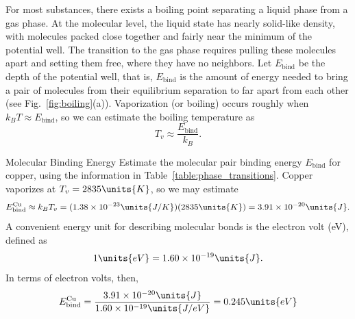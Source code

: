%

For most substances, there exists a boiling point separating a liquid
phase from a gas phase.  At the molecular level, the liquid state has
nearly solid-like density, with molecules packed close together and
fairly near the minimum of the potential well.  The transition to the
gas phase requires pulling these molecules apart and setting them
free, where they have no neighbors.  Let $E_\text{bind}$ be the depth
of the potential well, that is, $E_\text{bind}$ is the amount of
energy needed to bring a pair of molecules from their equilibrium
separation to far apart from each other (see
Fig.~\ref{fig:boiling}(a)).  Vaporization (or boiling) occurs roughly
when $k_BT\approx E_\text{bind}$, so we can estimate the boiling
temperature as
\begin{equation}
  T_v\approx\frac{E_\text{bind}}{k_B}.
\label{eq:t_v}
\end{equation}

\begin{example}{Molecular Binding Energy}
  Estimate the molecular pair binding energy $E_\text{bind}$ for
  copper, using the information in
  Table~\ref{table:phase_transitions}.  \solution Copper vaporizes at
  $T_v = 2835\units{K}$, so we may estimate
  \begin{equation}
    E_\text{bind}^{\rm Cu} \approx k_B T_v = (1.38\times 10^{-23}\units{J/K})
    (2835\units{K}) = 3.91\times 10^{-20}\units{J}.
  \end{equation}
  A convenient energy unit for describing molecular bonds is the
  electron volt (eV), defined as
  \begin{equation}
    1\units{eV} = 1.60\times 10^{-19}\units{J}.
  \end{equation}
  In terms of electron volts, then,
  \begin{equation}
    E_\text{bind}^{\rm Cu} = 
    \frac{3.91\times 10^{-20}\units{J}}{1.60\times 10^{-19}\units{J/eV}} 
    = 0.245\units{eV}
  \end{equation}
\end{example}

